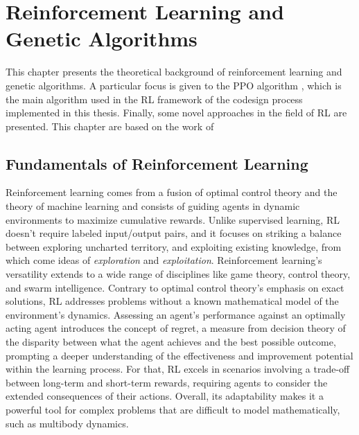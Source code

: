 \chapter{Reinforcement Learning and Genetic Algorithms}
\label{chp:back_RLGA}

This chapter presents the theoretical background of reinforcement learning and genetic algorithms. A particular focus is given to the \ac{PPO} algorithm \citep{schulman_proximal_2017}, which is the main algorithm used in the \ac{RL} framework of the codesign process implemented in this thesis. Finally, some novel approaches in the field of \ac{RL} are presented. This chapter are based on the work of \citet{sutton_reinforcement_1998,li_deep_2018,agarwal_deep_2022,holland_1992_ga}

\section{Fundamentals of Reinforcement Learning}

Reinforcement learning comes from a fusion of optimal control theory and the theory of machine learning and consists of guiding agents in dynamic environments to maximize cumulative rewards. Unlike supervised learning, \ac{RL} doesn't require labeled input/output pairs, and it focuses on striking a balance between exploring uncharted territory, and exploiting existing knowledge, from which come ideas of \textit{exploration} and \textit{exploitation}. Reinforcement learning's versatility extends to a wide range of disciplines like game theory, control theory, and swarm intelligence. Contrary to optimal control theory's emphasis on exact solutions, \ac{RL} addresses problems without a known mathematical model of the environment's dynamics. Assessing an agent's performance against an optimally acting agent introduces the concept of regret, a measure from decision theory of the disparity between what the agent achieves and the best possible outcome, prompting a deeper understanding of the effectiveness and improvement potential within the learning process. For that, \ac{RL} excels in scenarios involving a trade-off between long-term and short-term rewards, requiring agents to consider the extended consequences of their actions. Overall, its adaptability makes it a powerful tool for complex problems that are difficult to model mathematically, such as multibody dynamics.

